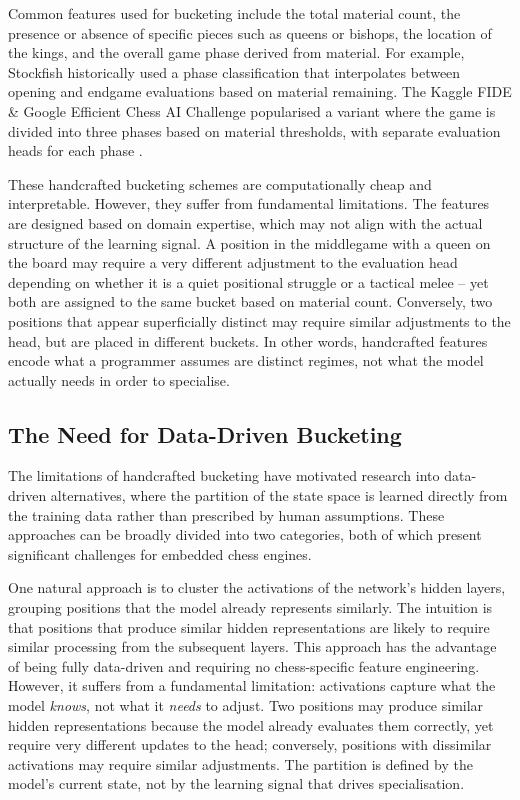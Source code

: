 Common features used for bucketing include the total material count, the presence or absence of specific pieces such as queens or bishops, the location of the kings, and the overall game phase derived from material. For example, Stockfish historically used a phase classification that interpolates between opening and endgame evaluations based on material remaining. The Kaggle FIDE \& Google Efficient Chess AI Challenge popularised a variant where the game is divided into three phases based on material thresholds, with separate evaluation heads for each phase \parencite{kagglefide}.


These handcrafted bucketing schemes are computationally cheap and interpretable. However, they suffer from fundamental limitations. The features are designed based on domain expertise, which may not align with the actual structure of the learning signal. A position in the middlegame with a queen on the board may require a very different adjustment to the evaluation head depending on whether it is a quiet positional struggle or a tactical melee -- yet both are assigned to the same bucket based on material count. Conversely, two positions that appear superficially distinct may require similar adjustments to the head, but are placed in different buckets. In other words, handcrafted features encode what a programmer assumes are distinct regimes, not what the model actually needs in order to specialise.

\subsection{The Need for Data-Driven Bucketing}
The limitations of handcrafted bucketing have motivated research into data-driven alternatives, where the partition of the state space is learned directly from the training data rather than prescribed by human assumptions. These approaches can be broadly divided into two categories, both of which present significant challenges for embedded chess engines.

One natural approach is to cluster the activations of the network's hidden layers, grouping positions that the model already represents similarly. The intuition is that positions that produce similar hidden representations are likely to require similar processing from the subsequent layers. This approach has the advantage of being fully data-driven and requiring no chess-specific feature engineering. However, it suffers from a fundamental limitation: activations capture what the model \emph{knows}, not what it \emph{needs} to adjust. Two positions may produce similar hidden representations because the model already evaluates them correctly, yet require very different updates to the head; conversely, positions with dissimilar activations may require similar adjustments. The partition is defined by the model's current state, not by the learning signal that drives specialisation.


